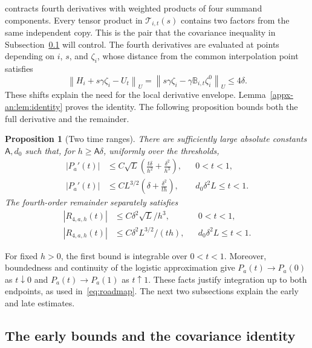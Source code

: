 \documentclass[11pt,letterpaper]{article}
\newcommand{\Ac}{\mathsf A}
\newtheorem{proposition}{Proposition}
\theoremstyle{remark}
\newcommand{\norm}[1]{\left\lVert#1\right\rVert}
\begin{document}
contracts fourth derivatives with weighted products of four summand
components. Every tensor product in \(\mathcal T_{i,t}(s)\) contains
two factors from the same independent copy. This is the pair that the
covariance inequality in Subsection~\ref{sec:outline-early} will control.
The fourth derivatives are evaluated at points depending on \(i\),
\(s\), and \(\zeta_i\), whose distance from the common interpolation
point satisfies
\[
 \norm{H_i+s\gamma\zeta_i-U_t}_U
 =\norm{s\gamma\zeta_i-\gamma\mathbb B_{i,t}\zeta_i^0}_U
 \le4\delta.
\]
These shifts explain the need for the local derivative envelope.
Lemma~\ref{appx-an:lem:identity} proves the identity. The following
proposition bounds both the full derivative and the remainder.

\begin{proposition}[Two time ranges]\label{an:prop:derivative}
There are sufficiently large absolute constants \(\Ac,d_0\) such that,
for \(h\ge\Ac\delta\), uniformly over the thresholds,
\begin{align}
 |P_a'(t)|&\le C\sqrt L\left(
 \frac{t\delta}{h^2}+\frac{\delta^2}{h^3}\right),
 &&0<t<1,\label{an:early}\\
 |P_a'(t)|&\le CL^{3/2}\left(
 \delta+\frac{\delta^2}{t h}\right),
 &&d_0\delta^2L\le t<1.\label{an:late}
\end{align}
The fourth-order remainder separately satisfies
\begin{align}
 |R_{4,a,h}(t)|&\le C\delta^2\sqrt L/h^3,
 &&0<t<1,\label{eq:remainder-early}\\
 |R_{4,a,h}(t)|&\le C\delta^2L^{3/2}/(t h),
 &&d_0\delta^2L\le t<1.\label{an:remainder}
\end{align}
\end{proposition}

For fixed \(h>0\), the first bound is integrable over \(0<t<1\).
Moreover, boundedness and continuity of the logistic approximation give
\(P_a(t)\to P_a(0)\) as \(t\downarrow0\) and
\(P_a(t)\to P_a(1)\) as \(t\uparrow1\). These facts justify integration
up to both endpoints, as used in~\eqref{eq:roadmap}. The next two
subsections explain the early and late estimates.

\subsection{The early bounds and the covariance identity}
\label{sec:outline-early}
\end{document}
